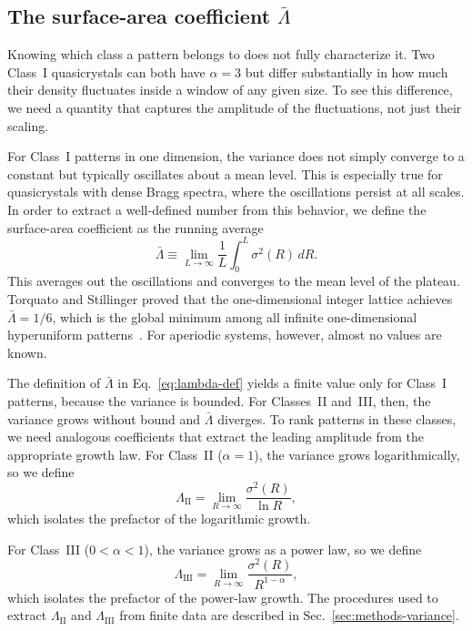 \documentclass[11pt]{article}
\begin{document}
\subsection{The surface-area coefficient $\bar\Lambda$}
\label{sec:theory-lambda}

Knowing which class a pattern belongs to does not fully characterize it. Two Class~I quasicrystals can both have $\alpha = 3$ but differ substantially in how much their density fluctuates inside a window of any given size. To see this difference, we need a quantity that captures the amplitude of the fluctuations, not just their scaling.

For Class~I patterns in one dimension, the variance does not simply converge to a constant but typically oscillates about a mean level. This is especially true for quasicrystals with dense Bragg spectra, where the oscillations persist at all scales. In order to extract a well-defined number from this behavior, we define the surface-area coefficient as the running average
\begin{equation}
 \bar\Lambda \equiv \lim_{L \to \infty} \frac{1}{L}\int_0^{L}
 \sigma^2(R)\,dR.
 \label{eq:lambda-def}
\end{equation}
This averages out the oscillations and converges to the mean level of the plateau. Torquato and Stillinger proved that the one-dimensional integer lattice achieves $\bar\Lambda = 1/6$, which is the global minimum among all infinite one-dimensional hyperuniform patterns~\cite{torquato2003local}. For aperiodic systems, however, almost no values are known.

The definition of $\bar\Lambda$ in Eq.~\eqref{eq:lambda-def} yields a finite value only for Class~I patterns, because the variance is bounded. For Classes~II and~III, then, the variance grows without bound and $\bar\Lambda$ diverges. To rank patterns in these classes, we need analogous coefficients that extract the leading amplitude from the appropriate growth law. For Class~II ($\alpha = 1$), the variance grows logarithmically, so we define
\begin{equation}
 \Lambda_\text{II} = \lim_{R \to \infty}
 \frac{\sigma^2(R)}{\ln R},
 \label{eq:lambda-II}
\end{equation}
which isolates the prefactor of the logarithmic growth.

For Class~III ($0 < \alpha < 1$), the variance grows as a power law, so we define
\begin{equation}
 \Lambda_\text{III} = \lim_{R \to \infty}
 \frac{\sigma^2(R)}{R^{1-\alpha}},
 \label{eq:lambda-III}
\end{equation}
which isolates the prefactor of the power-law growth. The procedures used to extract $\Lambda_\text{II}$ and $\Lambda_\text{III}$ from finite data are described in Sec.~\ref{sec:methods-variance}.
\end{document}
